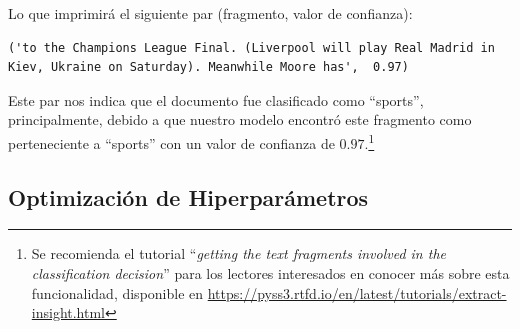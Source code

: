 Lo que imprimirá el siguiente par (fragmento, valor de confianza):

\begin{verbatim}
('to the Champions League Final. (Liverpool will play Real Madrid in Kiev, Ukraine on Saturday). Meanwhile Moore has',  0.97)
\end{verbatim}

Este par nos indica que el documento fue clasificado como ``sports'', principalmente, debido a que nuestro modelo encontró este fragmento como perteneciente a ``sports'' con un valor de confianza de $0.97$.\footnote{Se recomienda el tutorial ``\emph{getting the text fragments involved in the classification decision}'' para los lectores interesados en conocer más sobre esta funcionalidad, disponible en  \url{https://pyss3.rtfd.io/en/latest/tutorials/extract-insight.html}} 

\subsection{Optimización de Hiperparámetros}
\label{sec:eg-3}

